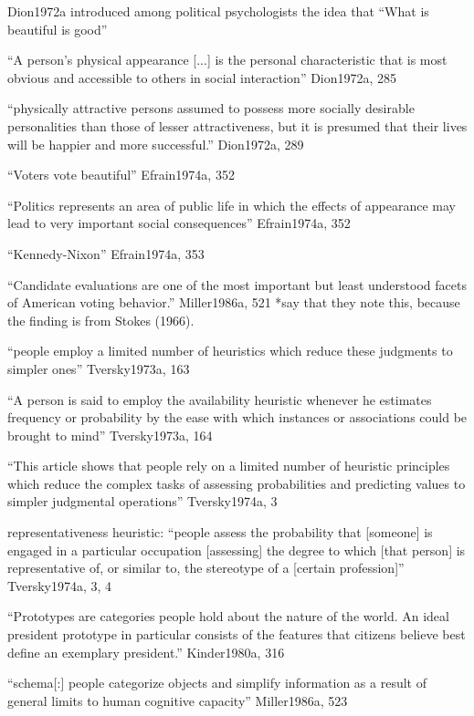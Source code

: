 Dion1972a introduced among political psychologists the idea that ``What is beautiful is good''

``A person's physical appearance [...] is the personal characteristic that is most obvious and accessible to others in social interaction'' Dion1972a, 285

``physically attractive persons assumed to possess more socially desirable personalities than those of lesser attractiveness, but it is presumed that their lives will be happier and more successful.'' Dion1972a, 289

``Voters vote beautiful'' Efrain1974a, 352

``Politics represents an area of public life in which the effects of appearance may lead to very important social consequences'' Efrain1974a, 352

``Kennedy-Nixon'' Efrain1974a, 353

``Candidate evaluations are one of the most important but least understood facets of American voting behavior.'' Miller1986a, 521 *say that they note this, because the finding is from Stokes (1966).


``people employ a limited number of heuristics which reduce these judgments to simpler ones'' Tversky1973a, 163

``A person is said to employ the availability heuristic whenever he estimates frequency or probability by the ease with which instances or associations could be brought to mind'' Tversky1973a, 164

``This article shows that people rely on a limited number of heuristic principles which reduce the complex tasks of assessing probabilities and predicting values to simpler judgmental operations'' Tversky1974a, 3

representativeness heuristic: ``people assess the probability that [someone] is engaged in a particular occupation [assessing] the degree to which [that person] is representative of, or similar to, the stereotype of a [certain profession]'' Tversky1974a, 3, 4

``Prototypes are categories people hold about the nature of the world. An ideal president prototype in particular consists of the features that citizens believe best define an exemplary president.'' Kinder1980a, 316

``schema[:] people categorize objects and simplify information as a result of general limits to human cognitive capacity'' Miller1986a, 523

